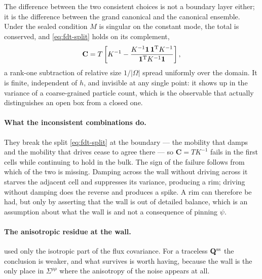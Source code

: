 \documentclass[a5paper]{article}
\begin{document}
The difference between the two consistent choices is not a boundary layer either; it is the difference between the grand canonical and the canonical ensemble. Under the sealed condition $M$ is singular on the constant mode, the total is conserved, and \eqref{eq:fdt-split} holds on its complement,
\begin{equation}
    \label{eq:canonical}
    \mathbf{C} = T\left[K^{-1} - \frac{K^{-1}\mathbf{1}\,\mathbf{1}^{\mathrm{T}} K^{-1}}{\mathbf{1}^{\mathrm{T}} K^{-1}\mathbf{1}}\right],
\end{equation}
a rank-one subtraction of relative size $1/|\Omega|$ spread uniformly over the domain. It is finite, independent of $h$, and invisible at any single point: it shows up in the variance of a coarse-grained particle count, which is the observable that actually distinguishes an open box from a closed one.

\paragraph{What the inconsistent combinations do.} They break the split \eqref{eq:fdt-split} at the boundary --- the mobility that damps and the mobility that drives cease to agree there --- so $\mathbf{C} = TK^{-1}$ fails in the first cells while continuing to hold in the bulk. The sign of the failure follows from which of the two is missing. Damping across the wall without driving across it starves the adjacent cell and suppresses its variance, producing a rim; driving without damping does the reverse and produces a spike. A rim can therefore be had, but only by asserting that the wall is out of detailed balance, which is an assumption about what the wall is and not a consequence of pinning $\psi$.

\paragraph{The anisotropic residue at the wall.}  used only the isotropic part of the flux covariance. For a traceless $\mathbf{Q}^{\mathrm{ss}}$ the conclusion is weaker, and what survives is worth having, because the wall is the only place in $\Sigma^{\rho\rho}$ where the anisotropy of the noise appears at all.
\end{document}

